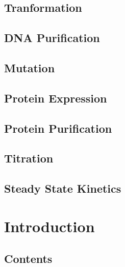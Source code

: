 \hypertarget{tranformation}{%
\subsection{Tranformation}\label{tranformation}}

\hypertarget{dna-purification}{%
\subsection{DNA Purification}\label{dna-purification}}

\hypertarget{mutation}{%
\subsection{Mutation}\label{mutation}}

\hypertarget{protein-expression}{%
\subsection{Protein Expression}\label{protein-expression}}

\hypertarget{protein-purification}{%
\subsection{Protein Purification}\label{protein-purification}}

\hypertarget{titration}{%
\subsection{Titration}\label{titration}}

\hypertarget{steady-state-kinetics-1}{%
\subsection{Steady State Kinetics}\label{steady-state-kinetics-1}}

\hypertarget{introduction}{%
\section{Introduction}\label{introduction}}

\hypertarget{contents-8}{%
\subsection{Contents}\label{contents-8}}

